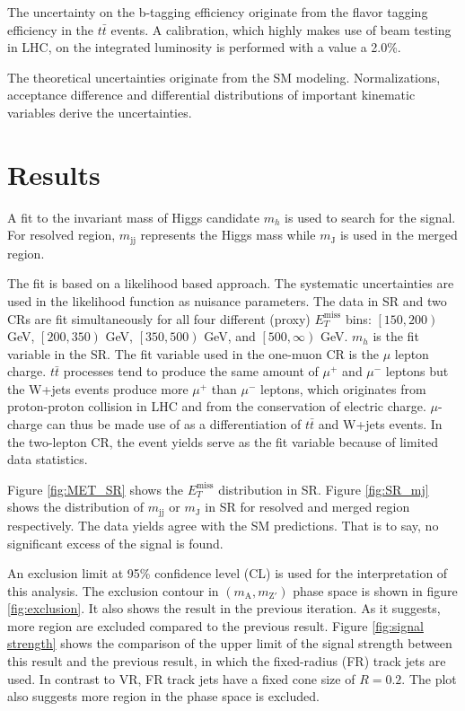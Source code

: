 \documentclass[class=NCU_thesis, crop=false]{standalone}
\begin{document}
	The uncertainty on the b-tagging efficiency originate from the flavor tagging efficiency in the $t\bar{t}$ events. A calibration, which highly makes use of beam testing in LHC, on the integrated luminosity is performed with a value a 2.0\%.
	
	The theoretical uncertainties originate from the SM modeling. Normalizations, acceptance difference and differential distributions of important kinematic variables derive the uncertainties.
	
\section{Results}
	A fit to the invariant mass of Higgs candidate $m_h$ is used to search for the signal. For resolved region, $m_{\mathrm{jj}}$ represents the Higgs mass while $m_{\mathrm{J}}$ is used in the merged region.
	
	The fit is based on a likelihood based approach. The systematic uncertainties are used in the likelihood function as nuisance parameters. The data in SR and two CRs are fit simultaneously for all four different (proxy) $E_T^{\mathrm{miss}}$ bins: $\left[150, 200\right)$ GeV, $\left[200, 350\right)$ GeV, $\left[350, 500\right)$ GeV, and $\left[500, \infty \right)$ GeV. $m_h$ is the fit variable in the SR. The fit variable used in the one-muon CR is the $\mu$ lepton charge. $t\bar{t}$ processes tend to produce the same amount of $\mu^+$ and $\mu^-$ leptons but the W+jets events produce more $\mu^+$ than $\mu^-$ leptons, which originates from proton-proton collision in LHC and from the conservation of electric charge. $\mu$-charge can thus be made use of as a differentiation of $t\bar{t}$ and W+jets events. In the two-lepton CR, the event yields serve as the fit variable because of limited data statistics.
	
	Figure \ref{fig:MET_SR} shows the $E_T^{\mathrm{miss}}$ distribution in SR. Figure \ref{fig:SR_mj} shows the distribution of $m_{\mathrm{jj}}$ or $m_{\mathrm{J}}$ in SR for resolved and merged region respectively. The data yields agree with the SM predictions. That is to say, no significant excess of the signal is found.
	
	An exclusion limit at 95\% confidence level (CL) is used for the interpretation of this analysis. The exclusion contour in $(m_{\mathrm{A}}, m_{\mathrm{Z'}})$ phase space is shown in figure \ref{fig:exclusion}. It also shows the result in the previous iteration. As it suggests, more region are excluded compared to the previous result. Figure \ref{fig:signal strength} shows the comparison of the upper limit of the signal strength between this result and the previous result, in which the fixed-radius (FR) track jets are used. In contrast to VR, FR track jets have a fixed cone size of $R = 0.2$. The plot also suggests more region in the phase space is excluded.
	
\end{document}
